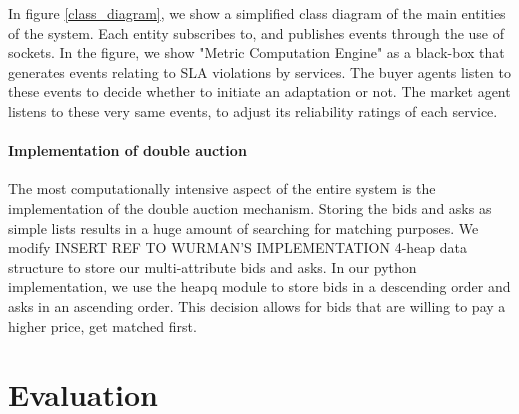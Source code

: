 \documentclass[10pt,journal,compsoc]{IEEEtran}
\begin{document}
%	

In figure \ref{class_diagram}, we show a simplified class diagram of the main entities of the system. Each entity subscribes to, and publishes events through the use of sockets. In the figure, we show "Metric Computation Engine" as a black-box that generates events relating to SLA violations by services. The buyer agents listen to these events to decide whether to initiate an adaptation or not. The market agent listens to these very same events, to adjust its reliability ratings of each service. 

%
%

\paragraph{Implementation of double auction}
The most computationally intensive aspect of the entire system is the implementation of the double auction mechanism. Storing the bids and asks as simple lists results in a huge amount of searching for matching purposes. We modify {INSERT REF TO WURMAN'S IMPLEMENTATION} 4-heap data structure to store our multi-attribute bids and asks. In our python implementation, we use the heapq module to store bids in a descending order and asks in an ascending order. This decision allows for bids that are willing to pay a higher price, get matched first. 

\section{Evaluation}
\end{document}
